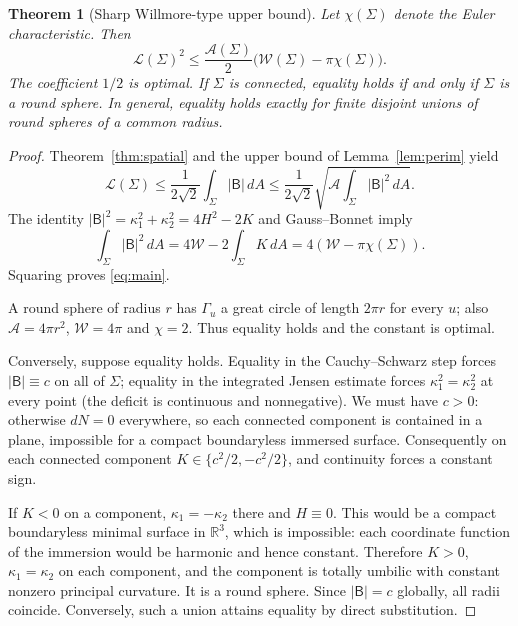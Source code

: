 \documentclass[10pt,a4paper]{article}
\newtheorem{theorem}{Theorem}[section]
\theoremstyle{remark}\newtheorem{remark}[theorem]{Remark}
\newcommand{\A}{\mathcal A}
\newcommand{\W}{\mathcal W}
\newcommand{\Lc}{\mathcal L}
\newcommand{\Bop}{\mathsf B}
\begin{document}
\begin{theorem}[Sharp Willmore-type upper bound]\label{thm:main}
Let $\chi(\Sigma)$ denote the Euler characteristic. Then
\begin{equation}\label{eq:main}
\boxed{\displaystyle \Lc(\Sigma)^2\leq
\frac{\A(\Sigma)}{2}\bigl(\W(\Sigma)-\pi\chi(\Sigma)\bigr).}
\end{equation}
The coefficient $1/2$ is optimal. If $\Sigma$ is connected, equality holds if and only if $\Sigma$ is a round sphere. In general, equality holds exactly for finite disjoint unions of round spheres of a common radius.
\end{theorem}
\begin{proof}
Theorem~\ref{thm:spatial} and the upper bound of Lemma~\ref{lem:perim} yield
\[
\Lc(\Sigma)\leq\frac1{2\sqrt2}\int_\Sigma|\Bop|\,dA
\leq\frac1{2\sqrt2}\sqrt{\A\int_\Sigma|\Bop|^2\,dA}.
\]
The identity $|\Bop|^2=\kappa_1^2+\kappa_2^2=4H^2-2K$ and Gauss--Bonnet imply
\begin{equation}\label{eq:BWillmore}
\int_\Sigma|\Bop|^2\,dA=4\W-2\int_\Sigma K\,dA
=4(\W-\pi\chi(\Sigma)).
\end{equation}
Squaring proves \eqref{eq:main}.

A round sphere of radius $r$ has $\Gamma_u$ a great circle of length $2\pi r$ for every $u$; also $\A=4\pi r^2$, $\W=4\pi$ and $\chi=2$. Thus equality holds and the constant is optimal.

Conversely, suppose equality holds. Equality in the Cauchy--Schwarz step forces $|\Bop|\equiv c$ on all of $\Sigma$; equality in the integrated Jensen estimate forces $\kappa_1^2=\kappa_2^2$ at every point (the deficit is continuous and nonnegative). We must have $c>0$: otherwise $dN=0$ everywhere, so each connected component is contained in a plane, impossible for a compact boundaryless immersed surface. Consequently on each connected component $K\in\{c^2/2,-c^2/2\}$, and continuity forces a constant sign.

If $K<0$ on a component, $\kappa_1=-\kappa_2$ there and $H\equiv0$. This would be a compact boundaryless minimal surface in $\mathbb R^3$, which is impossible: each coordinate function of the immersion would be harmonic and hence constant. Therefore $K>0$, $\kappa_1=\kappa_2$ on each component, and the component is totally umbilic with constant nonzero principal curvature. It is a round sphere. Since $|\Bop|=c$ globally, all radii coincide. Conversely, such a union attains equality by direct substitution.\qedhere
\end{proof}
\end{document}

